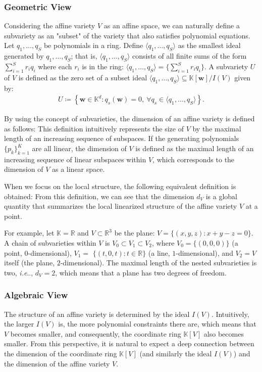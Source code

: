 \documentclass{article}
\makeatletter
\def\@onedot{\ifx\@let@token.\else.\null\fi\xspace}
\DeclareRobustCommand\onedot{\futurelet\@let@token\@onedot}
\def\ie{\emph{i.e}\onedot}
\theoremstyle{plain}
\theoremstyle{definition}
\theoremstyle{remark}
\makeatother
\begin{document}
\subsubsection{Geometric View}
Considering the affine variety \(V\) as an affine space, we can naturally define a subvariety as an "subset" of the variety that also satisfies polynomial equations. Let \(q_1, \ldots, q_S\) be polynomials in a ring.
Define $\langle q_1, \ldots, q_S\rangle$ as the smallest ideal generated by $q_1, \ldots, q_S$; that is, $\langle q_1, \ldots, q_S\rangle$ consists of all finite sums of the form $\sum_{i=1}^S r_i q_i$ where each $r_i$ is in the ring: $\langle q_1, \ldots, q_S\rangle=\{\sum_{i=1}^S r_iq_i\}$.
A subvariety $U$ of $V$ is defined as the zero set of a subset ideal $\langle q_1, \ldots, q_S\rangle \subseteq \mathbb{K}[\bm{w}]/I(V)$ given by:
\begin{gather*}
U \coloneqq \left\{ \bm{w} \in \mathbb{K}^d : q_s(\bm{w}) = 0,\ \forall q_s \in \langle q_1, \ldots, q_S\rangle\right\}.
\end{gather*}

By using the concept of subvarieties, the dimension of an affine variety is defined as follows:
\maxChain*
This definition intuitively represents the size of \(V\) by the maximal length of an increasing sequence of subspaces. If the generating polynomials \(\{ p_k \}_{k=1}^K\) are all linear, the dimension of \(V\) is defined as the maximal length of an increasing sequence of linear subspaces within \(V\), which corresponds to the dimension of \(V\) as a linear space.

When we focus on the local structure, the following equivalent definition is obtained:
\tangentSpace*
From this definition, we can see that the dimension \(d_V\) is a global quantity that summarizes the local linearized structure of the affine variety \(V\) at a point.

For example, let $\mathbb{K}=\mathbb{R}$ and $V \subset \mathbb{R}^3$ be the plane: $V=\{(x, y, z): x+y-z=0\}$. A chain of subvarieties within $V$ is $V_0 \subset V_1 \subset V_2$, where $V_0=\{(0,0,0)\}$ (a point, $0$-dimensional), $V_1=$ $\{(t, 0, t): t \in \mathbb{R}\}$ (a line, $1$-dimensional), and $V_2=V$ itself (the plane, $2$-dimensional). 
The maximal length of the nested subvarieties is two, \ie, $d_V=2$, which means that a plane has two degrees of freedom. 

\subsubsection{Algebraic View}
The structure of an affine variety is determined by the ideal \(I(V)\). Intuitively, the larger \(I(V)\) is, the more polynomial constraints there are, which means that \(V\) becomes smaller, and consequently, the coordinate ring \(\mathbb{K}[V]\) also becomes smaller. From this perspective, it is natural to expect a deep connection between the dimension of the coordinate ring \(\mathbb{K}[V]\) (and similarly the ideal \(I(V)\)) and the dimension of the affine variety \(V\). 
\end{document}

